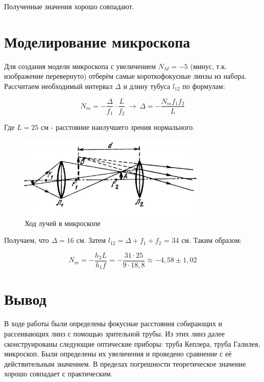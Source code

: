 \documentclass[15pt,a5paper,reqno]{article}
\begin{document}
Полученные значения хорошо совпадают.


\section{Моделирование микроскопа}

Для создания модели микроскопа с увеличением $N_M = -5$ (минус, т.к. изображение перевернуто) отберём самые короткофокусные линзы из набора. 
Рассчитаем необходимый интервал $\Delta$ и длину тубуса  $l_12$ по формулам:

\[ N_m = -\frac{\Delta}{f_1} \cdot \frac{L}{f_2} \: \rightarrow \: \Delta = -\frac{N_m f_1 f_2}{L}  \]


Где $L = 25$ см - расстояние наилучшего зрения нормального. 

\begin{figure}[h!]
    \centering
    \includegraphics[width=9cm]{pics/micro.png}
    \caption{Ход лучей в микроскопе}
    \label{}
\end{figure}


Получаем, что $\Delta = 16$ см. Затем $l_12 = \Delta + f_1 + f_2$ = 34 см.
Таким образом:

\[   N_m = -\frac{h_2 L}{h_1 f} = -\frac{31 \cdot 25}{9 \cdot 18,8} \approx -4,58  \pm 1,02  \]


   
\section{Вывод}
В ходе работы были определены фокусные расстояния собирающих и рассеивающих линз с помощью зрительной трубы. 
\newline
Из этих линз далее сконструированы следующие оптические приборы: труба Кеплера, труба Галилея, микроскоп. 
\newline
Были определены их увеличения и проведено сравнение с её действительным значением. В пределах погрешности теоретическое значение хорошо совпадает с практическим.
\end{document}
